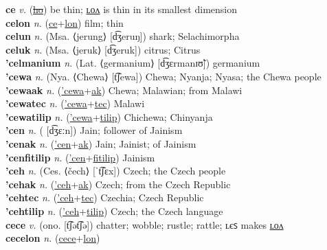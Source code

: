 \textbf{ce} \textit{v.} (\hyperref[ho]{\sout{ho}})
be thin; \hyperref[celon]{ʟᴏᴧ} is thin in its smallest dimension \label{ce} \\
\textbf{celon} \textit{n.} (\hyperref[ce]{ce}+\hyperref[lon]{lon})
film; thin \label{celon} \\
\textbf{celun} \textit{n.} (Msa. ⟨jerung⟩ [d͡ʒeruŋ])
shark; Selachimorpha \label{celun} \\
\textbf{celuk} \textit{n.} (Msa. ⟨jeruk⟩ [d͡ʒeruk])
citrus; Citrus \label{celuk} \\
\textbf{'celmanium} \textit{n.} (Lat. ⟨germanium⟩ [d͡ʒɛrmanɪʊ̃])
germanium \label{'celmanium} \\
\textbf{'cewa} \textit{n.} (Nya. ⟨Chewa⟩ [t͡ʃewa])
Chewa; Nyanja; Nyasa; the Chewa people \label{'cewa} \\
\textbf{'cewaak} \textit{n.} (\hyperref['cewa]{'cewa}+\hyperref[ak]{ak})
Chewa; Malawian; from Malawi \label{'cewaak} \\
\textbf{'cewatec} \textit{n.} (\hyperref['cewa]{'cewa}+\hyperref[tec]{tec})
Malawi \label{'cewatec} \\
\textbf{'cewatilip} \textit{n.} (\hyperref['cewa]{'cewa}+\hyperref[tilip]{tilip})
Chichewa; Chinyanja \label{'cewatilip} \\
\textbf{'cen} \textit{n.} ( [d͡ʒɛːn])
Jain; follower of Jainism \label{'cen} \\
\textbf{'cenak} \textit{n.} (\hyperref['cen]{'cen}+\hyperref[ak]{ak})
Jain; Jainist; of Jainism \label{'cenak} \\
\textbf{'cenfitilip} \textit{n.} (\hyperref['cen]{'cen}+\hyperref[fitilip]{fitilip})
Jainism \label{'cenfitilip} \\
\textbf{'ceh} \textit{n.} (Ces. ⟨čech⟩ [ˈt͡ʃɛx])
Czech; the Czech people \label{'ceh} \\
\textbf{'cehak} \textit{n.} (\hyperref['ceh]{'ceh}+\hyperref[ak]{ak})
Czech; from the Czech Republic \label{'cehak} \\
\textbf{'cehtec} \textit{n.} (\hyperref['ceh]{'ceh}+\hyperref[tec]{tec})
Czechia; Czech Republic \label{'cehtec} \\
\textbf{'cehtilip} \textit{n.} (\hyperref['ceh]{'ceh}+\hyperref[tilip]{tilip})
Czech; the Czech language \label{'cehtilip} \\
\textbf{cece} \textit{v.} (ono. [t͡ʃət͡ʃə])
chatter; wobble; rustle; rattle; ʟєꜱ makes \hyperref[cecelon]{ʟᴏᴧ} \label{cece} \\
\textbf{cecelon} \textit{n.} (\hyperref[cece]{cece}+\hyperref[lon]{lon})
